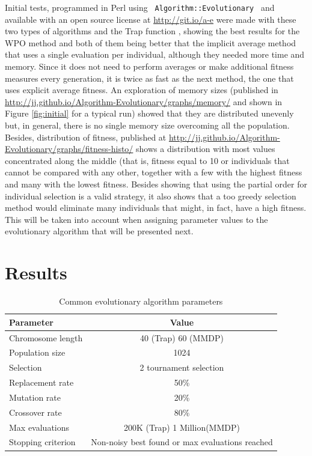 \documentclass{llncs}
\begin{document}
Initial tests, programmed in Perl using {\tt
  Algorithm::Evolutionary}~\cite{ae09} and available with an open
source license at \url{http://git.io/a-e} were made with these two types of algorithms and the
Trap function \cite{wilcoxon:ga}, showing the best results for the WPO
method and both of them being better that
the implicit average method that uses a single evaluation per
individual, although they needed more time and memory. Since it does not need to perform averages or make
additional fitness measures every generation, it is twice as fast as
the next method, the one that uses explicit average fitness. An
exploration of memory sizes (published in
  \url{http://jj.github.io/Algorithm-Evolutionary/graphs/memory/} and shown in Figure \ref{fig:initial} for a
typical run) showed that they are distributed unevenly but, in general, there is no single memory size
overcoming all the population. Besides, distribution of fitness, published at
  \url{http://jj.github.io/Algorithm-Evolutionary/graphs/fitness-histo/} shows a
distribution with most values concentrated along the middle (that is,
fitness equal to 10 or individuals that cannot be compared with any
other, together with a few with the highest fitness and many with the
lowest fitness. Besides showing that using the partial order for individual selection 
is a valid strategy, it also shows that a too greedy selection method would
eliminate many individuals that might, in fact, have a high fitness. This
will be taken into account when assigning parameter values to the
evolutionary algorithm that will be presented next.



\section{Results}
\label{sec:res}

\begin{table}[!htbp]
\begin{center}
\caption{Common evolutionary algorithm parameters}
\label{fig:ga_params}
\begin{tabular}{lc}%
\hline\noalign{\smallskip}
\noalign{\smallskip}
Parameter & Value \\
\hline
\noalign{\smallskip}
Chromosome length & 40 (Trap) 60 (MMDP)\\
Population size & 1024\\
Selection & 2 tournament selection \\
Replacement rate & 50\% \\
Mutation rate & 20\% \\
Crossover rate &  80\% \\
Max evaluations & 200K (Trap) 1 Million(MMDP) \\
Stopping criterion & Non-noisy best found or max evaluations reached \\
\hline
\end{tabular}
\end{center}
\end{table}
\end{document}
